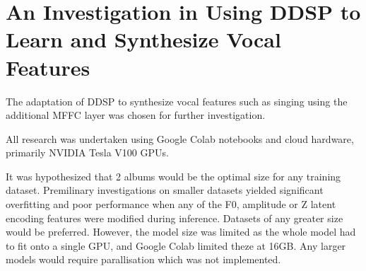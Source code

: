 \chapter{An Investigation in Using DDSP to Learn and Synthesize Vocal Features}

The adaptation of DDSP to synthesize vocal features such as singing using the additional MFFC layer was chosen for further investigation.

All research was undertaken using Google Colab notebooks and cloud hardware, primarily NVIDIA Tesla V100 GPUs.

It was hypothesized that 2 albums would be the optimal size for any training dataset. Premilinary investigations on smaller datasets yielded significant overfitting and poor performance when any of the F0, amplitude or Z latent encoding features were modified during inference. Datasets of any greater size would be preferred. However, the model size was limited as the whole model had to fit onto a single GPU, and Google Colab limited theze at 16GB. Any larger models would require parallisation which was not implemented.



